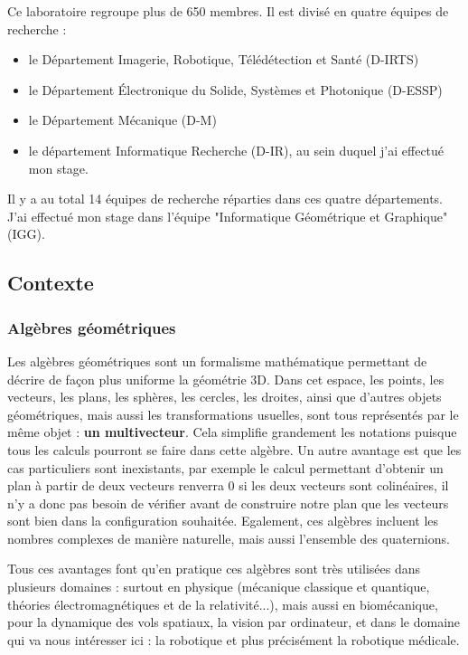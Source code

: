 Ce laboratoire regroupe plus de 650 membres. Il est divisé en quatre équipes de recherche : 

\begin{itemize} 
\item le Département Imagerie, Robotique, Télédétection et Santé (D-IRTS)
\item le Département Électronique du Solide, Systèmes et Photonique (D-ESSP)
\item le Département Mécanique (D-M)
\item le département Informatique Recherche (D-IR), au sein duquel j'ai effectué mon stage. 
\end{itemize}
Il y a au total 14 équipes de recherche réparties dans ces quatre départements. J'ai effectué mon stage dans l'équipe "Informatique Géométrique et Graphique" (IGG). 

\subsection{Contexte}
\subsubsection{Algèbres géométriques}

Les algèbres géométriques sont un formalisme mathématique permettant de décrire de façon plus uniforme la géométrie 3D. Dans cet espace, les points, les vecteurs, les plans, les sphères, les cercles, les droites, ainsi que d'autres objets géométriques, mais aussi les transformations usuelles, sont tous représentés par le même objet : \textbf{un multivecteur}.
Cela simplifie grandement les notations puisque tous les calculs pourront se faire dans cette algèbre. Un autre avantage est que les cas particuliers sont inexistants, par exemple le calcul permettant d'obtenir un plan à partir de deux vecteurs renverra $0$ si les deux vecteurs sont colinéaires, il n'y a donc pas besoin de vérifier avant de construire notre plan que les vecteurs sont bien dans la configuration souhaitée. Egalement, ces algèbres incluent les nombres complexes de manière naturelle, mais aussi l'ensemble des quaternions. 

Tous ces avantages font qu'en pratique ces algèbres sont très utilisées dans plusieurs domaines : surtout en physique (mécanique classique et quantique, théories électromagnétiques et de la relativité...), mais aussi en biomécanique, pour la dynamique des vols spatiaux, la vision par ordinateur, et dans le domaine qui va nous intéresser ici : la robotique et plus précisément la robotique médicale.


